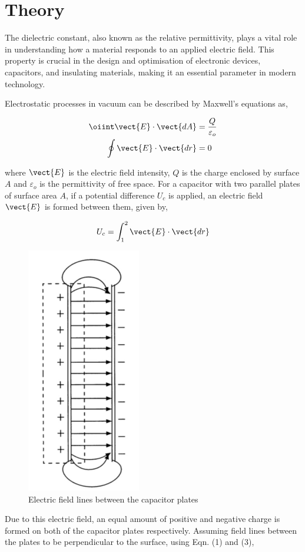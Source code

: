 \section{Theory}

The dielectric constant, also known as the relative permittivity, plays a vital role in understanding how a material responds to an applied electric field. This property is crucial in the design and optimisation of electronic devices, capacitors, and insulating materials, making it an essential parameter in modern technology.

Electrostatic processes in vacuum can be described by Maxwell’s equations as,

\begin{align}
    \oiint \vect{E} \cdot \vect{dA} &= \frac{Q}{\varepsilon_o}\\
    \oint \vect{E} \cdot \vect{dr} &= 0
\end{align}

where $\vect{E}$ is the electric field intensity, $Q$ is the charge enclosed by surface $A$ and $\varepsilon_o$ is the permittivity of free space. For a capacitor with two parallel plates of surface area $A$, if a potential difference $U_c$ is applied, an electric field $\vect{E}$ is formed between them, given by,

\begin{align}
    U_c = \int_1^2 \vect{E} \cdot \vect{dr}
\end{align}

\begin{figure}[H]
    \centering
    \includegraphics[height=0.5\columnwidth]{images/f1.png}
    \caption{Electric field lines between the capacitor plates}
    \label{fig:1}
\end{figure}

Due to this electric field, an equal amount of positive and negative charge is formed on both of the capacitor plates respectively. Assuming field lines between the plates to be perpendicular to the surface, using Eqn. (1) and (3), 

